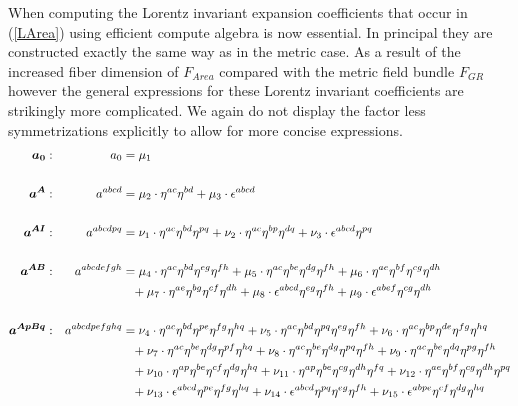 \documentclass[a4paper,12pt, DIV=14, BCOR=5mm, twoside, headsepline, numbers=noenddot]{scrbook}
\begin{document}
When computing the Lorentz invariant expansion coefficients that occur in (\ref{LArea}) using efficient compute algebra is now essential. In principal they are constructed exactly the same way as in the metric case. As a result of the increased fiber dimension of $F_{Area}$ compared with the metric field bundle $F_{GR}$ however the general expressions for these Lorentz invariant coefficients are strikingly more complicated. We again do not display the factor less symmetrizations explicitly to allow for more concise expressions.
\begin{align}\label{LorentzArea1}
\begin{alignedat}{2}
\boldsymbol{a_0}&: \ \ \ & a_0  &= \mu_1 \\
\\
\boldsymbol{a^{A}}&: \ \ \ & a^{abcd}  &= \mu_2 \cdot \eta^{ac} \eta^{bd} + \mu_{3} \cdot \epsilon^{abcd} \\
\\
\boldsymbol{a^{AI}}&: \ \ \ & a^{abcdpq}  &=  \nu_{1}\cdot\eta^{ac}\eta^{bd}\eta^{pq}+\nu_{2}\cdot\eta^{ac}\eta^{bp}\eta^{dq} + \nu_{3}\cdot\epsilon^{abcd}\eta^{pq}\\
\\
\boldsymbol{a^{AB}}&: \ \ \ & a^{abcdefgh}  &= \mu_{4}\cdot\eta^{ac}\eta^{bd}\eta^{eg}\eta^{fh}+\mu_{5}\cdot\eta^{ac}\eta^{be}\eta^{dg}\eta^{fh}+\mu_{6}\cdot\eta^{ae}\eta^{bf}\eta^{cg}\eta^{dh} \\
& & &\hphantom{=} +\mu_{7}\cdot\eta^{ae}\eta^{bg}\eta^{cf}\eta^{dh} + \mu_{8}\cdot\epsilon^{abcd}\eta^{eg}\eta^{fh}+\mu_{9}\cdot\epsilon^{abef}\eta^{cg}\eta^{dh}\\
\\
\boldsymbol{a^{ApBq}}&: \ \ \ & a^{abcdpefghq}  &=
\nu_{4}\cdot\eta^{ac}\eta^{bd}\eta^{pe}\eta^{fg}\eta^{hq}+\nu_{5}\cdot\eta^{ac}\eta^{bd}\eta^{pq}\eta^{eg}\eta^{fh}+\nu_{6}\cdot\eta^{ac}\eta^{bp}\eta^{de}\eta^{fg}\eta^{hq}\\
& & &\hphantom{=}+\nu_{7}\cdot\eta^{ac}\eta^{be}\eta^{dg}\eta^{pf}\eta^{hq}+\nu_{8}\cdot\eta^{ac}\eta^{be}\eta^{dg}\eta^{pq}\eta^{fh}+\nu_{9}\cdot\eta^{ac}\eta^{be}\eta^{dq}\eta^{pg}\eta^{fh}\\
& & &\hphantom{=}+\nu_{10}\cdot\eta^{ap}\eta^{be}\eta^{cf}\eta^{dg}\eta^{hq}+\nu_{11}\cdot\eta^{ap}\eta^{be}\eta^{cg}\eta^{dh}\eta^{fq}+\nu_{12}\cdot\eta^{ae}\eta^{bf}\eta^{cg}\eta^{dh}\eta^{pq}\\
& & &\hphantom{=} +\nu_{13}\cdot\epsilon^{abcd}\eta^{pe}\eta^{fg}\eta^{hq}+\nu_{14}\cdot\epsilon^{abcd}\eta^{pq}\eta^{eg}\eta^{fh}+\nu_{15}\cdot\epsilon^{abpe}\eta^{cf}\eta^{dg}\eta^{hq}\\

\end{alignedat}
\end{align}
\end{document}
